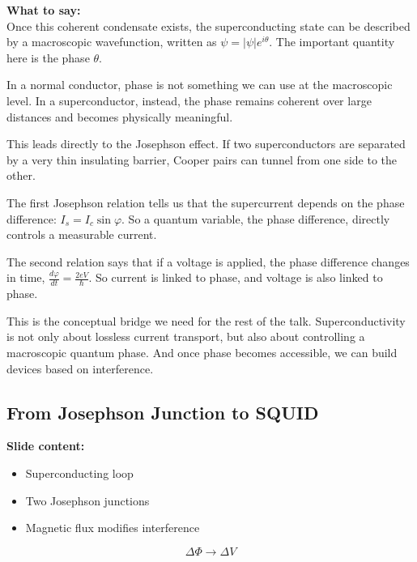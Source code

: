 \documentclass[11pt,a4paper]{article}
\newcommand{\points}[1]{{\color{accent}\textbf{Slide content:}}\\#1}
\newcommand{\speech}[1]{{\color{accent}\textbf{What to say:}}\\#1}
\begin{document}
\speech{
Once this coherent condensate exists, the superconducting state can be described by a macroscopic wavefunction, written as $\psi = |\psi| e^{i\theta}$. The important quantity here is the phase $\theta$.

In a normal conductor, phase is not something we can use at the macroscopic level. In a superconductor, instead, the phase remains coherent over large distances and becomes physically meaningful.

This leads directly to the Josephson effect. If two superconductors are separated by a very thin insulating barrier, Cooper pairs can tunnel from one side to the other.

The first Josephson relation tells us that the supercurrent depends on the phase difference: $I_s = I_c \sin \varphi$. So a quantum variable, the phase difference, directly controls a measurable current.

The second relation says that if a voltage is applied, the phase difference changes in time, $\frac{d\varphi}{dt} = \frac{2eV}{\hbar}$. So current is linked to phase, and voltage is also linked to phase.

This is the conceptual bridge we need for the rest of the talk. Superconductivity is not only about lossless current transport, but also about controlling a macroscopic quantum phase. And once phase becomes accessible, we can build devices based on interference.
}


\subsection{From Josephson Junction to SQUID}

\points{
\begin{itemize}
\item Superconducting loop
\item Two Josephson junctions
\item Magnetic flux modifies interference
\end{itemize}

\[
\Delta \Phi \rightarrow \Delta V
\]
}
\end{document}
